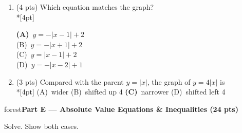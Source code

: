 \documentclass[12pt]{article}
\newcommand{\lgrid}[4]{%
  \draw[step=1, linegray!40, very thin] (#1,#3) grid (#2,#4);
  \draw[->, semithick, charcoal] (#1,0)--(#2,0) node[below right, font=\scriptsize]{$x$};
  \draw[->, semithick, charcoal] (0,#3)--(0,#4) node[left, font=\scriptsize]{$y$};}
\newcommand{\parthead}[1]{%
  \boxguard[10]\vspace{6pt}\noindent
  \begin{headlinebox}{forest}\color{white}\bfseries #1\end{headlinebox}%
  \vspace{4pt}}
\newcommand{\opt}[2]{(#1)~#2}
\newcommand{\optok}[2]{\mbox{\llap{\textcolor{keyred}{$\boldsymbol{\rightarrow}$}\,}\textcolor{keyred}{\textbf{(#1)}~#2}}}
\begin{document}
\begin{enumerate}[leftmargin=1.9em, itemsep=10pt, label=\arabic*., start=15]
  \item {}(4 pts) Which equation matches the graph?
    \\*[4pt]
    \begin{minipage}[c]{0.36\linewidth}\centering
    \end{minipage}%
    \begin{minipage}[c]{0.6\linewidth}
    \optok{A}{$y=-|x-1|+2$} \\[6pt]
    \opt{B}{$y=-|x+1|+2$} \\[6pt]
    \opt{C}{$y=|x-1|+2$} \\[6pt]
    \opt{D}{$y=-|x-2|+1$}
    \end{minipage}

  \item {}(3 pts) Compared with the parent $y=|x|$, the graph of $y=4|x|$ is
    \\*[4pt]
    \opt{A}{wider} \hfill \opt{B}{shifted up 4} \hfill \optok{C}{narrower} \hfill
    \opt{D}{shifted left 4}
\end{enumerate}

\parthead{Part E --- Absolute Value Equations \& Inequalities (24 pts)}
Solve. Show both cases.
\end{document}
